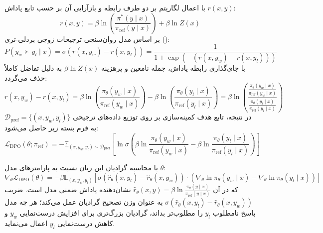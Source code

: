 با اعمال لگاریتم بر دو طرف رابطه و بازآرایی آن بر حسب تابع پاداش $r(x, y)$:
\begin{equation}
    r(x, y) = \beta \ln \left( \frac{\pi^*(y \mid x)}{\pi_{\text{ref}}(y \mid x)} \right) + \beta \ln Z(x)
\end{equation}
بر اساس مدل روان‌سنجی ترجیحات زوجی بردلی-تری ():
\begin{equation}
    P(y_w \succ y_l \mid x) = \sigma\left( r(x, y_w) - r(x, y_l) \right) = \frac{1}{1 + \exp\left( -(r(x, y_w) - r(x, y_l)) \right)}
\end{equation}
با جای‌گذاری رابطه پاداش، جمله نامعین و پرهزینه $\beta \ln Z(x)$ به دلیل تفاضل کاملاً حذف می‌گردد:
\begin{equation}
    r(x, y_w) - r(x, y_l) = \beta \ln \left( \frac{\pi_\theta(y_w \mid x)}{\pi_{\text{ref}}(y_w \mid x)} \right) - \beta \ln \left( \frac{\pi_\theta(y_l \mid x)}{\pi_{\text{ref}}(y_l \mid x)} \right) = \beta \ln \left( \frac{\frac{\pi_\theta(y_w \mid x)}{\pi_{\text{ref}}(y_w \mid x)}}{\frac{\pi_\theta(y_l \mid x)}{\pi_{\text{ref}}(y_l \mid x)}} \right)
\end{equation}
در نتیجه، تابع هدف کمینه‌سازی  بر روی توزیع داده‌های ترجیحی $\mathcal{D}_{\text{pref}} = \{(x, y_w, y_l)\}$ به فرم بسته زیر حاصل می‌شود:
\begin{equation}
    \mathcal{L}_{\text{DPO}}(\theta; \pi_{\text{ref}}) = - \mathbb{E}_{(x, y_w, y_l) \sim \mathcal{D}_{\text{pref}}} \left[ \ln \sigma \left( \beta \ln \frac{\pi_\theta(y_w \mid x)}{\pi_{\text{ref}}(y_w \mid x)} - \beta \ln \frac{\pi_\theta(y_l \mid x)}{\pi_{\text{ref}}(y_l \mid x)} \right) \right]
\end{equation}

با محاسبه گرادیان این زیان نسبت به پارامترهای مدل $\theta$:
\begin{equation}
    \nabla_\theta \mathcal{L}_{\text{DPO}}(\theta) = - \beta \mathbb{E}_{(x, y_w, y_l)} \left[ \sigma\left( \hat{r}_\theta(x, y_l) - \hat{r}_\theta(x, y_w) \right) \cdot \left( \nabla_\theta \ln \pi_\theta(y_w \mid x) - \nabla_\theta \ln \pi_\theta(y_l \mid x) \right) \right]
\end{equation}
که در آن $\hat{r}_\theta(x, y) = \beta \ln \frac{\pi_\theta(y \mid x)}{\pi_{\text{ref}}(y \mid x)}$ نشان‌دهنده پاداش ضمنی مدل است. ضریب $\sigma\left( \hat{r}_\theta(x, y_l) - \hat{r}_\theta(x, y_w) \right)$ به عنوان وزن تصحیح گرادیان عمل می‌کند؛ هر چه مدل پاسخ نامطلوب $y_l$ را مطلوب‌تر بداند، گرادیان بزرگ‌تری برای افزایش درست‌نمایی $y_w$ و کاهش درست‌نمایی $y_l$ اعمال می‌نماید.

